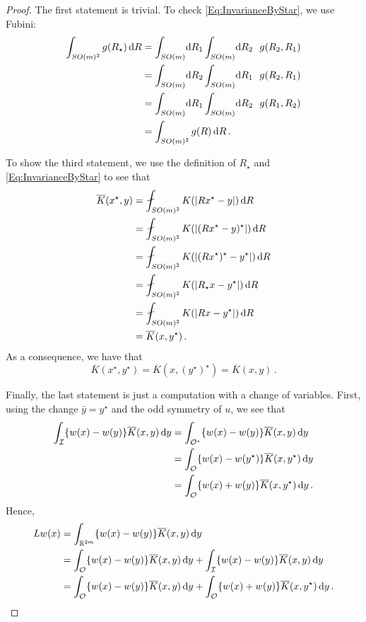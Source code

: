 \begin{proof}
	The first statement is trivial. To check \eqref{Eq:InvarianceByStar}, we use Fubini:
    \begin{align*}
    \int_{SO(m)^2} g(R_\star) \d R & = \int_{SO(m)} \!\! \d R_1 \int_{SO(m)} \!\! \d R_2 \ \ g(R_2, R_1) \\
    & =  \int_{SO(m)} \!\! \d R_2 \int_{SO(m)} \!\! \d R_1 \ \ g(R_2, R_1) \\
    & =  \int_{SO(m)} \!\! \d R_1 \int_{SO(m)} \!\! \d R_2 \ \ g(R_1, R_2) \\
    & =  \int_{SO(m)^2} g(R) \d R\,. 
    \end{align*} 
    
    To show the third statement, we use the definition of $R_\star$ and \eqref{Eq:InvarianceByStar} to see that
        \begin{align*}
		\overline{K}(x^\star,y) &= \average_{SO(m)^2} K(|Rx^\star - y|) \d R \\
        &= \average_{SO(m)^2} K(|(Rx^\star - y)^\star|) \d R \\
		&= \average_{SO(m)^2} K(|(R x^\star)^\star - y^\star|) \d R \\
		&= \average_{SO(m)^2} K(|R_\star x - y^\star|) \d R \\
		&= \average_{SO(m)^2} K(|Rx - y^\star|) \d R \\
		&= \overline{K}(x,y^\star)\,. 
	\end{align*}
    As a consequence, we have that 
    $$\overline{K}(x^\star,y^\star) = \overline{K}(x,(y^\star)^\star) = \overline{K}(x,y)\,.$$
    
 
    
	Finally, the last statement is just a computation with a change of variables. First, using the change $\bar{y} = y^\star$ and the odd symmetry of $u$, we see that
	\begin{align*}
	\int_{\mathcal{I}}  \{w(x) - w(y) \} \overline{K}(x, y)\,\mathrm{d} y &= \int_{\mathcal{O}^\star} \{w(x) - w(y) \}\overline{K}(x, y)\,\mathrm{d} y \\
	&= \int_{\mathcal{O}} \{w(x) - w(y^\star) \}\overline{K}(x, y^\star)\,\mathrm{d} y \\
	&= \int_{\mathcal{O}} \{w(x) + w(y) \}\overline{K}(x, y^\star)\,\mathrm{d} y\,.
	\end{align*}
	Hence,
	\begin{align*}
		Lw (x) &= \int_{\mathbb{R}^{2m}}  \{w(x) - w(y) \} \overline{K}(x, y)\,\mathrm{d} y \\
		&= \int_{\mathcal{O}}  \{w(x) - w(y) \} \overline{K}(x, y)\,\mathrm{d} y +\int_{\mathcal{I}}  \{w(x) - w(y) \} \overline{K}(x, y)\,\mathrm{d} y \\
		&= \int_{\mathcal{O}} \{w(x) - w(y) \} \overline{K}(x, y) \,\mathrm{d} y +  \int_{\mathcal{O}} \{w(x) + w(y) \} \overline{K}(x, y^\star) \,\mathrm{d} y \,.
	\end{align*}
\end{proof}

